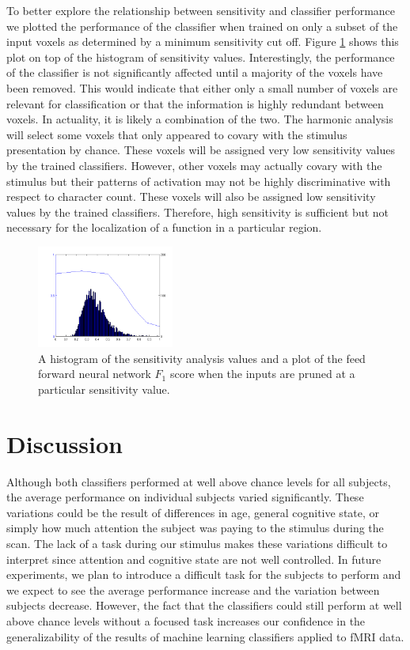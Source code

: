 \documentclass[preprint,5p,authoryear]{elsarticle}
\begin{document}
To better explore the relationship between sensitivity and classifier performance we plotted the performance of the classifier when trained on only a subset of the input voxels as determined by a minimum sensitivity cut off.
Figure \ref{fig:sensitivity-cutoff} shows this plot on top of the histogram of sensitivity values.
Interestingly, the performance of the classifier is not significantly affected until a majority of the voxels have been removed.
This would indicate that either only a small number of voxels are relevant for classification or that the information is highly redundant between voxels.
In actuality, it is likely a combination of the two.
The harmonic analysis will select some voxels that only appeared to covary with the stimulus presentation by chance.
These voxels will be assigned very low sensitivity values by the trained classifiers.
However, other voxels may actually covary with the stimulus but their patterns of activation may not be highly discriminative with respect to character count.
These voxels will also be assigned low sensitivity values by the trained classifiers.
Therefore, high sensitivity is sufficient but not necessary for the localization of a function in a particular region.

\begin{figure}
\centering
\includegraphics[width=0.4\textwidth]{figures/sensitivity-cutoff}
\caption{A histogram of the sensitivity analysis values and a plot of the feed forward neural network $F_1$ score when the inputs are pruned at a particular sensitivity value. }
\label{fig:sensitivity-cutoff}
\end{figure}

\section{Discussion}
Although both classifiers performed at well above chance levels for all subjects, the average performance on individual subjects varied significantly.
These variations could be the result of differences in age, general cognitive state, or simply how much attention the subject was paying to the stimulus during the scan.
The lack of a task during our stimulus makes these variations difficult to interpret since attention and cognitive state are not well controlled.
In future experiments, we plan to introduce a difficult task for the subjects to perform and we expect to see the average performance increase and the variation between subjects decrease.
However, the fact that the classifiers could still perform at well above chance levels without a focused task increases our confidence in the generalizability of the results of machine learning classifiers applied to fMRI data.
\end{document}
